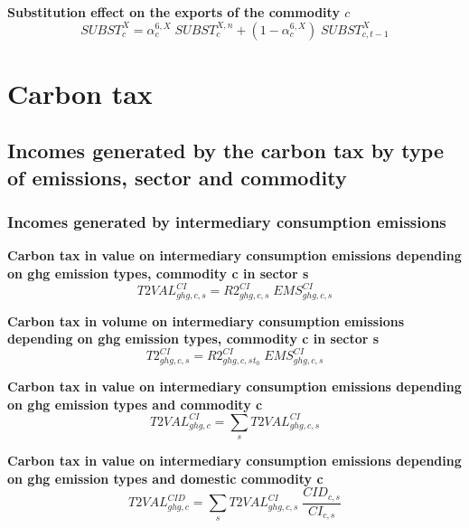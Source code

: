 \documentclass[12pt]{article}
\numberwithin{equation}{section}
\begin{document}
\noindent \textbf{Substitution effect on the exports of the commodity $c$} 
\begin{dmath}
SUBST^{X}_{c} = \alpha^{{6},X}_{c} \; SUBST^{X,n}_{c} + \left( 1 - \alpha^{{6},X}_{c} \right) \; SUBST^{X}_{c, t-1}
\label{adjustments.mdlSUBST_X[c]}
\end{dmath}


\section{Carbon tax}





\subsection{Incomes generated by the carbon tax by type of emissions, sector and commodity}





\subsubsection{Incomes generated by intermediary consumption emissions}



\noindent \textbf{Carbon tax in value on intermediary consumption emissions depending on ghg emission types, commodity c in sector s} 
\begin{dmath}
T2VAL^{CI}_{ghg, c, s} = R2^{CI}_{ghg, c, s} \; EMS^{CI}_{ghg, c, s}
\label{Exception_taxes_prices.mdlT2VAL_CI[ghg,c,s]}
\end{dmath}

\noindent \textbf{Carbon tax in volume on intermediary consumption emissions depending on ghg emission types, commodity c in sector s} 
\begin{dmath}
T2^{CI}_{ghg, c, s} = R2^{CI}_{ghg, c, s}_{t_0} \; EMS^{CI}_{ghg, c, s}
\label{Exception_taxes_prices.mdlT2_CI[ghg,c,s]}
\end{dmath}

\noindent \textbf{Carbon tax in value on intermediary consumption emissions depending on ghg emission types and commodity c} 
\begin{dmath}
T2VAL^{CI}_{ghg, c} = \sum_{s} T2VAL^{CI}_{ghg, c, s}
\label{Exception_taxes_prices.mdlT2VAL_CI[ghg,c]}
\end{dmath}

\noindent \textbf{Carbon tax in value on intermediary consumption emissions depending on ghg emission types and domestic commodity c} 
\begin{dmath}
T2VAL^{CID}_{ghg, c} = \sum_{s} T2VAL^{CI}_{ghg, c, s} \; \frac{CID_{c, s}}{CI_{c, s}}
\label{Exception_taxes_prices.mdlT2VAL_CID[ghg,c]}
\end{dmath}
\end{document}
